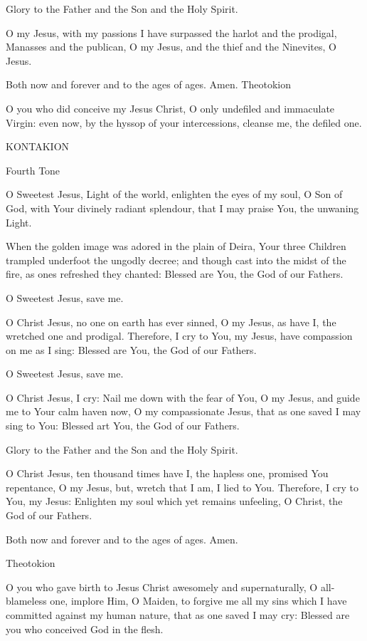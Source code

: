 Glory to the Father and the Son and the Holy Spirit.

O my Jesus, with my passions I have surpassed the harlot and the
prodigal, Manasses and the publican, O my Jesus, and the thief and the
Ninevites, O Jesus.

Both now and forever and to the ages of ages. Amen. Theotokion

O you who did conceive my Jesus Christ, O only undefiled and immaculate
Virgin: even now, by the hyssop of your intercessions, cleanse me, the
defiled one.

KONTAKION

Fourth Tone

O Sweetest Jesus, Light of the world, enlighten the eyes of my soul, O
Son of God, with Your divinely radiant splendour, that I may praise You,
the unwaning Light.

When the golden image was adored in the plain of Deira, Your three
Children trampled underfoot the ungodly decree; and though cast into the
midst of the fire, as ones refreshed they chanted: Blessed are You, the
God of our Fathers.

O Sweetest Jesus, save me.

O Christ Jesus, no one on earth has ever sinned, O my Jesus, as have I,
the wretched one and prodigal. Therefore, I cry to You, my Jesus, have
compassion on me as I sing: Blessed are You, the God of our Fathers.

O Sweetest Jesus, save me.

O Christ Jesus, I cry: Nail me down with the fear of You, O my Jesus,
and guide me to Your calm haven now, O my compassionate Jesus, that as
one saved I may sing to You: Blessed art You, the God of our Fathers.

Glory to the Father and the Son and the Holy Spirit.

O Christ Jesus, ten thousand times have I, the hapless one, promised You
repentance, O my Jesus, but, wretch that I am, I lied to You. Therefore,
I cry to You, my Jesus: Enlighten my soul which yet remains unfeeling, O
Christ, the God of our Fathers.

Both now and forever and to the ages of ages. Amen.

Theotokion

O you who gave birth to Jesus Christ awesomely and supernaturally, O
all-blameless one, implore Him, O Maiden, to forgive me all my sins
which I have committed against my human nature, that as one saved I may
cry: Blessed are you who conceived God in the flesh.

